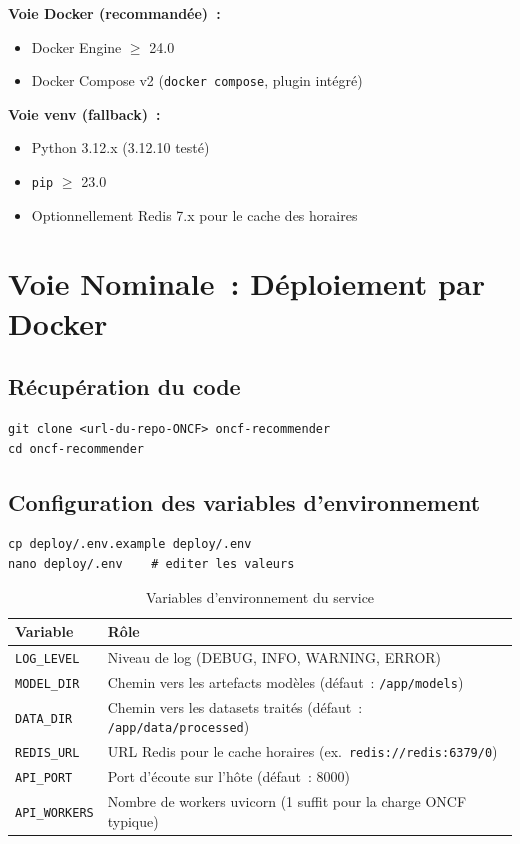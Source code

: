 \documentclass[12pt, a4paper]{report}
\begin{document}
\textbf{Voie Docker (recommandée)~:}
\begin{itemize}
\item Docker Engine $\geq$ 24.0
\item Docker Compose v2 (\texttt{docker compose}, plugin intégré)
\end{itemize}

\textbf{Voie venv (fallback)~:}
\begin{itemize}
\item Python 3.12.x (3.12.10 testé)
\item \texttt{pip} $\geq$ 23.0
\item Optionnellement Redis 7.x pour le cache des horaires
\end{itemize}

\section{Voie Nominale~: Déploiement par Docker}

\subsection{Récupération du code}

\begin{lstlisting}[style=bash]
git clone <url-du-repo-ONCF> oncf-recommender
cd oncf-recommender
\end{lstlisting}

\subsection{Configuration des variables d'environnement}

\begin{lstlisting}[style=bash]
cp deploy/.env.example deploy/.env
nano deploy/.env    # editer les valeurs
\end{lstlisting}

\begin{table}[H]
\centering
\caption{Variables d'environnement du service}
\begin{tabularx}{\linewidth}{|l|X|}
\hline
\textbf{Variable} & \textbf{Rôle} \\
\hline
\texttt{LOG\_LEVEL} & Niveau de log (DEBUG, INFO, WARNING, ERROR) \\
\hline
\texttt{MODEL\_DIR} & Chemin vers les artefacts modèles (défaut~: \texttt{/app/models}) \\
\hline
\texttt{DATA\_DIR} & Chemin vers les datasets traités (défaut~: \texttt{/app/data/processed}) \\
\hline
\texttt{REDIS\_URL} & URL Redis pour le cache horaires (ex.\ \texttt{redis://redis:6379/0}) \\
\hline
\texttt{API\_PORT} & Port d'écoute sur l'hôte (défaut~: 8000) \\
\hline
\texttt{API\_WORKERS} & Nombre de workers uvicorn (1 suffit pour la charge ONCF typique) \\
\hline
\end{tabularx}
\end{table}
\end{document}
